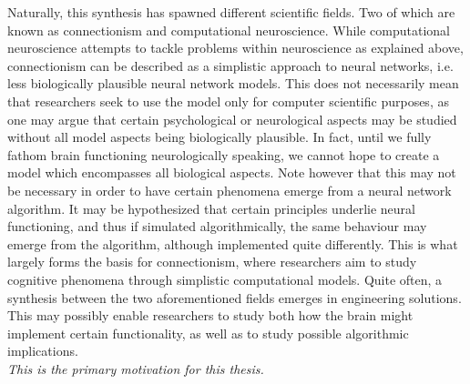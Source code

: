 Naturally, this synthesis has spawned different scientific fields. Two of which are known as connectionism and computational neuroscience. While computational neuroscience attempts to tackle problems within neuroscience as explained above, connectionism can be described as a simplistic approach to neural networks, i.e. less biologically plausible neural network models. This does not necessarily mean that researchers seek to use the model only for computer scientific purposes, as one may argue that certain psychological or neurological aspects may be studied without all model aspects being biologically plausible. In fact, until we fully fathom brain functioning neurologically speaking, we cannot hope to create a model which encompasses all biological aspects. Note however that this may not be necessary in order to have certain phenomena emerge from a neural network algorithm. It may be hypothesized that certain principles underlie neural functioning, and thus if simulated algorithmically, the same behaviour may emerge from the algorithm, although implemented quite differently. This is what largely forms the basis for connectionism, where researchers aim to study cognitive phenomena through simplistic computational models.
Quite often, a synthesis between the two aforementioned fields emerges in engineering solutions. This may possibly enable researchers to study both how the brain might implement certain functionality, as well as to study possible algorithmic implications.
\\

\textit{This is the primary motivation for this thesis.}
\\


